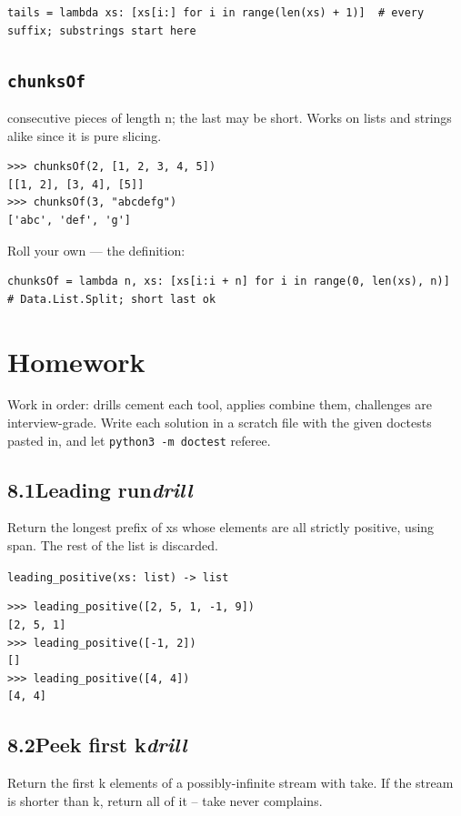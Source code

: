 \documentclass[10pt,letterpaper]{book}
\begin{document}
\begin{lstlisting}[style=ex]
tails = lambda xs: [xs[i:] for i in range(len(xs) + 1)]  # every suffix; substrings start here
\end{lstlisting}
\subsection{\texttt{chunksOf}}\label{def:chunksOf}
consecutive pieces of length n; the last may be short. Works on lists and strings alike since it is pure slicing.
\begin{lstlisting}[style=ex]
>>> chunksOf(2, [1, 2, 3, 4, 5])
[[1, 2], [3, 4], [5]]
>>> chunksOf(3, "abcdefg")
['abc', 'def', 'g']
\end{lstlisting}

Roll your own --- the definition:

\begin{lstlisting}[style=ex]
chunksOf = lambda n, xs: [xs[i:i + n] for i in range(0, len(xs), n)]  # Data.List.Split; short last ok
\end{lstlisting}
\section{Homework}
Work in order: drills cement each tool, applies combine them,
challenges are interview-grade. Write each solution in a scratch file with
the given doctests pasted in, and let \texttt{python3 -m doctest} referee.
\subsection*{8.1\quad Leading run\hfill\textnormal{\textit{drill}}}
Return the longest prefix of xs whose elements are all strictly positive, using span. The rest of the list is discarded.

\noindent\texttt{leading\_positive(xs: list) -> list}
\begin{lstlisting}[style=ex]
>>> leading_positive([2, 5, 1, -1, 9])
[2, 5, 1]
>>> leading_positive([-1, 2])
[]
>>> leading_positive([4, 4])
[4, 4]
\end{lstlisting}
\subsection*{8.2\quad Peek first k\hfill\textnormal{\textit{drill}}}
Return the first k elements of a possibly-infinite stream with take. If the stream is shorter than k, return all of it -- take never complains.
\end{document}
